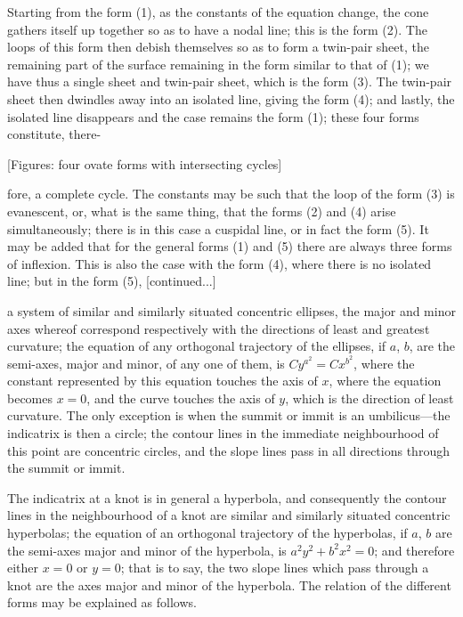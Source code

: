 \documentclass[11pt,a4paper]{article}
\begin{document}
Starting from the form (1), as the constants of the equation change, the cone gathers itself up together so as to have a nodal line; this is the form (2). The loops of this form then debish themselves so as to form a twin-pair sheet, the remaining part of the surface remaining in the form similar to that of (1); we have thus a single sheet and twin-pair sheet, which is the form (3). The twin-pair sheet then dwindles away into an isolated line, giving the form (4); and lastly, the isolated line disappears and the case remains the form (1); these four forms constitute, there-

\begin{center}
[Figures: four ovate forms with intersecting cycles]
\end{center}

\noindent
fore, a complete cycle. The constants may be such that the loop of the form (3) is evanescent, or, what is the same thing, that the forms (2) and (4) arise simultaneously; there is in this case a cuspidal line, or in fact the form (5). It may be added that for the general forms (1) and (5) there are always three forms of inflexion. This is also the case with the form (4), where there is no isolated line; but in the form (5), [continued...]

\setcounter{page}{110}

a system of similar and similarly situated concentric ellipses, the major and minor axes whereof correspond respectively with the directions of least and greatest curvature; the equation of any orthogonal trajectory of the ellipses, if $a$, $b$, are the semi-axes, major and minor, of any one of them, is $Cy^{a^2} = Cx^{b^2}$, where the constant represented by this equation touches the axis of $x$, where the equation becomes $x=0$, and the curve touches the axis of $y$, which is the direction of least curvature. The only exception is when the summit or immit is an umbilicus---the indicatrix is then a circle; the contour lines in the immediate neighbourhood of this point are concentric circles, and the slope lines pass in all directions through the summit or immit.

The indicatrix at a knot is in general a hyperbola, and consequently the contour lines in the neighbourhood of a knot are similar and similarly situated concentric hyperbolas; the equation of an orthogonal trajectory of the hyperbolas, if $a$, $b$ are the semi-axes major and minor of the hyperbola, is $a^2y^2 + b^2x^2 = 0$; and therefore either $x=0$ or $y=0$; that is to say, the two slope lines which pass through a knot are the axes major and minor of the hyperbola. The relation of the different forms may be explained as follows.
\end{document}
